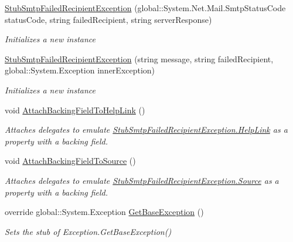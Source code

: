 \begin{DoxyCompactItemize}
\hyperlink{class_system_1_1_net_1_1_mail_1_1_fakes_1_1_stub_smtp_failed_recipient_exception_afada21d4c45843fca6ab0e49bc103e5d}{Stub\-Smtp\-Failed\-Recipient\-Exception} (global\-::\-System.\-Net.\-Mail.\-Smtp\-Status\-Code status\-Code, string failed\-Recipient, string server\-Response)
\begin{DoxyCompactList}\small\item\em Initializes a new instance\end{DoxyCompactList}\item 
\hyperlink{class_system_1_1_net_1_1_mail_1_1_fakes_1_1_stub_smtp_failed_recipient_exception_a550b932311c22fff4f21c0d114f1fa31}{Stub\-Smtp\-Failed\-Recipient\-Exception} (string message, string failed\-Recipient, global\-::\-System.\-Exception inner\-Exception)
\begin{DoxyCompactList}\small\item\em Initializes a new instance\end{DoxyCompactList}\item 
void \hyperlink{class_system_1_1_net_1_1_mail_1_1_fakes_1_1_stub_smtp_failed_recipient_exception_aefffa796bdd5d9f42d2e0f3634143e07}{Attach\-Backing\-Field\-To\-Help\-Link} ()
\begin{DoxyCompactList}\small\item\em Attaches delegates to emulate \hyperlink{class_system_1_1_net_1_1_mail_1_1_fakes_1_1_stub_smtp_failed_recipient_exception_a3d64c300ebe921352270d555f37c6532}{Stub\-Smtp\-Failed\-Recipient\-Exception.\-Help\-Link} as a property with a backing field.\end{DoxyCompactList}\item 
void \hyperlink{class_system_1_1_net_1_1_mail_1_1_fakes_1_1_stub_smtp_failed_recipient_exception_a91684537053d00089817f32f21cf7385}{Attach\-Backing\-Field\-To\-Source} ()
\begin{DoxyCompactList}\small\item\em Attaches delegates to emulate \hyperlink{class_system_1_1_net_1_1_mail_1_1_fakes_1_1_stub_smtp_failed_recipient_exception_a6806ecd6f7f72d27a44ee9a33fa72ae8}{Stub\-Smtp\-Failed\-Recipient\-Exception.\-Source} as a property with a backing field.\end{DoxyCompactList}\item 
override global\-::\-System.\-Exception \hyperlink{class_system_1_1_net_1_1_mail_1_1_fakes_1_1_stub_smtp_failed_recipient_exception_a7801a98221c6b2b96a71dbf07ab38c3d}{Get\-Base\-Exception} ()
\begin{DoxyCompactList}\small\item\em Sets the stub of Exception.\-Get\-Base\-Exception()\end{DoxyCompactList}\item 

\end{DoxyCompactItemize}
